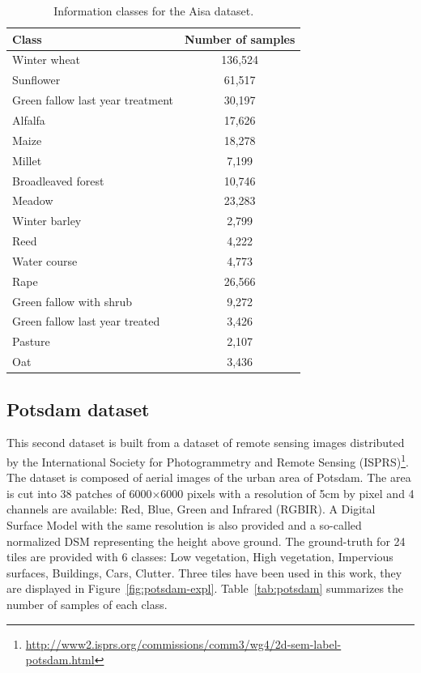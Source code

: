 \documentclass[journal]{IEEEtran}
\begin{document}
    \begin{table}[!t]
        \centering
        \caption{Information classes for the Aisa dataset.\label{tab:aisa}}
        \begin{tabular}[b]{lc}\toprule
          Class & Number of samples \\ \midrule
          Winter wheat & 136,524 \\
          Sunflower & 61,517 \\
          Green fallow last year treatment & 30,197 \\
          Alfalfa & 17,626 \\
          Maize & 18,278 \\
          Millet & 7,199 \\
          Broadleaved forest & 10,746 \\
          Meadow & 23,283 \\
          Winter barley & 2,799 \\
          Reed & 4,222 \\
          Water course & 4,773 \\
          Rape & 26,566 \\
          Green fallow with shrub & 9,272 \\
          Green fallow last year treated & 3,426 \\
          Pasture & 2,107 \\
          Oat & 3,436 \\ \bottomrule
        \end{tabular}
    \end{table}

    \subsection{Potsdam dataset}
    \label{sec:pots-dataset}

    This  second dataset  is built  from a  dataset of  remote sensing
    images distributed by the International Society for Photogrammetry
    and                         Remote                         Sensing
    (ISPRS)\footnote{\url{http://www2.isprs.org/commissions/comm3/wg4/2d-sem-label-potsdam.html}}. The
    dataset is composed of aerial images of the urban area of Potsdam.
    The area is cut into 38  patches of 6000$\times$6000 pixels with a
    resolution  of 5cm  by pixel  and 4  channels are  available: Red,
    Blue, Green  and Infrared (RGBIR).   A Digital Surface  Model with
    the same  resolution is also  provided and a  so-called normalized
    DSM representing the height above  ground. The ground-truth for 24
    tiles  are   provided  with   6  classes:  Low   vegetation,  High
    vegetation, Impervious surfaces,  Buildings, Cars, Clutter.  Three
    tiles  have  been  used  in  this  work,  they  are  displayed  in
    Figure~\ref{fig:potsdam-expl}.  Table~\ref{tab:potsdam} summarizes
    the  number of  samples of  each class.
\end{document}
